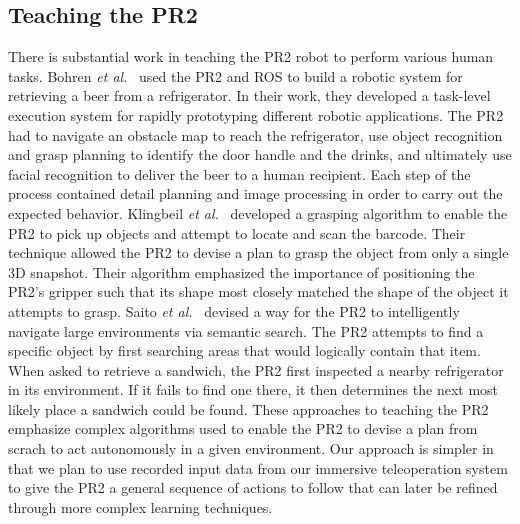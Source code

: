 \documentclass{sig-alternate}
\begin{document}
\subsection{Teaching the PR2}
\label{sec:teach_pr2}
\indent There is substantial work in teaching the PR2 robot to perform various human tasks. Bohren \textit{et al.}~\cite{beer} used the PR2 and ROS to build a robotic system for retrieving a beer from a refrigerator. In their work, they developed a task-level execution system for rapidly prototyping different robotic applications. The PR2 had to navigate an obstacle map to reach the refrigerator, use object recognition and grasp planning to identify the door handle and the drinks, and ultimately use facial recognition to deliver the beer to a human recipient. Each step of the process contained detail planning and image processing in order to carry out the expected behavior. Klingbeil \textit{et al.}~\cite{groceries} developed a grasping algorithm to enable the PR2 to pick up objects and attempt to locate and scan the barcode. Their technique allowed the PR2 to devise a plan to grasp the object from only a single 3D snapshot. Their algorithm emphasized the importance of positioning the PR2's gripper such that its shape most closely matched the shape of the object it attempts to grasp. Saito \textit{et al.}~\cite{subway} devised a way for the PR2 to intelligently navigate large environments via semantic search. The PR2 attempts to find a specific object by first searching areas that would logically contain that item. When asked to retrieve a sandwich, the PR2 first inspected a nearby refrigerator in its environment. If it fails to find one there, it then determines the next most likely place a sandwich could be found. These approaches to teaching the PR2 emphasize complex algorithms used to enable the PR2 to devise a plan from scrach to act autonomously in a given environment. Our approach is simpler in that we plan to use recorded input data from our immersive teleoperation system to give the PR2 a general sequence of actions to follow that can later be refined through more complex learning techniques.
\end{document}
